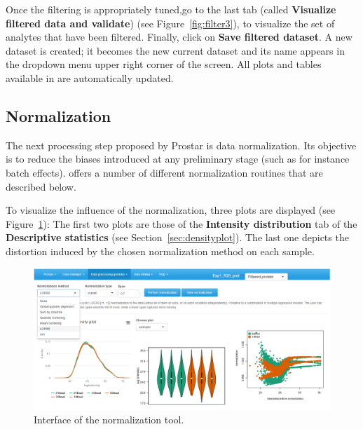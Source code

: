 \documentclass[12pt]{article}
\begin{document}
Once the filtering is appropriately tuned,go to the last tab 
(called \textbf{Visualize filtered data and validate}) (see Figure~\ref{fig:filter3}), to visualize 
the set of analytes that have been filtered.  
Finally, click on \textbf{Save filtered dataset}. 
A new dataset is created; it becomes the new 
current dataset and its name appears in the dropdown menu upper right corner 
of the screen. All plots and tables available in  
are automatically updated.

\subsection{Normalization}\label{sec:normalization}

The next processing step proposed by Prostar is data normalization. 
Its objective is to reduce the biases introduced at any preliminary 
stage (such as for instance batch effects).
 offers a number of different normalization 
routines that are described below.

To visualize the influence of the normalization, three plots are displayed
(see Figure~\ref{fig:norma}):
The first two plots are those of the \textbf{Intensity distribution} tab of the 
\textbf{Descriptive statistics} (see Section~\ref{sec:densityplot}).
The last one depicts the distortion induced by the chosen normalization 
method on each sample.

\begin {figure}
\includegraphics[width=\textwidth]{images/normalisation.png}
\caption{Interface of the normalization tool.}\label{fig:norma}
\end {figure}
\end{document}
